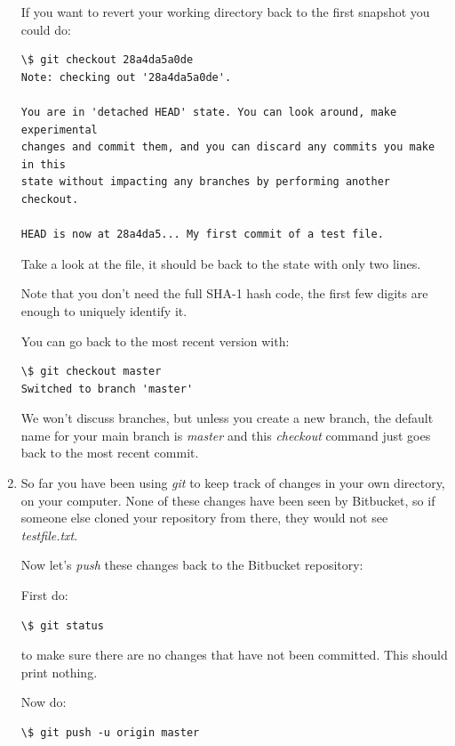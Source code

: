 \documentclass[letterpaper,10pt,english]{sphinxmanual}
\begin{document}
\begin{enumerate}
If you want to revert your working directory back to the first snapshot
you could do:

\begin{Verbatim}[commandchars=\\\{\}]
\$ git checkout 28a4da5a0de
Note: checking out '28a4da5a0de'.

You are in 'detached HEAD' state. You can look around, make experimental
changes and commit them, and you can discard any commits you make in this
state without impacting any branches by performing another checkout.

HEAD is now at 28a4da5... My first commit of a test file.
\end{Verbatim}

Take a look at the file, it should be back to the state with only two
lines.

Note that you don't need the full SHA-1 hash code, the first few digits
are enough to uniquely identify it.

You can go back to the most recent version with:

\begin{Verbatim}[commandchars=\\\{\}]
\$ git checkout master
Switched to branch 'master'
\end{Verbatim}

We won't discuss branches, but unless you create a new branch, the
default name for your main branch is \emph{master} and this \emph{checkout} command
just goes back to the most recent commit.

\item {} 
So far you have been using \emph{git} to keep track of changes in your own
directory, on your computer.  None of these changes have been seen by
Bitbucket, so if someone else cloned your repository from there, they
would not see \emph{testfile.txt}.

Now let's \emph{push} these changes back to the Bitbucket repository:

First do:

\begin{Verbatim}[commandchars=\\\{\}]
\$ git status
\end{Verbatim}

to make sure there are no changes that have not been committed.  This
should print nothing.

Now do:

\begin{Verbatim}[commandchars=\\\{\}]
\$ git push -u origin master
\end{Verbatim}


\end{enumerate}
\end{document}
